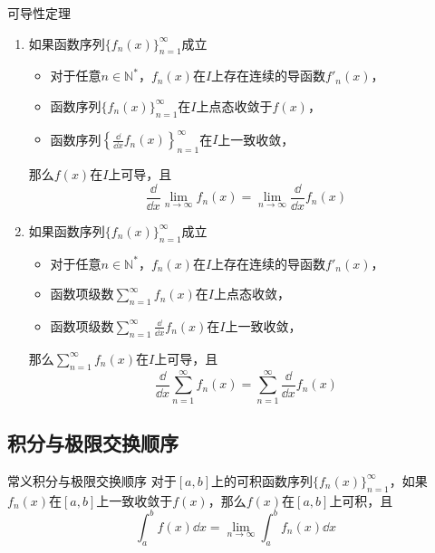 \documentclass[lang = cn, scheme = chinese, thmcnt = section]{elegantbook}
\newcommand{\N}{\mathbb{N}}            %
\newcommand{\dis}{\displaystyle}
\begin{document}
\begin{theorem}{可导性定理}
	\begin{enumerate}
		\item 如果函数序列$\{f_n(x)\}_{n=1}^{\infty}$成立
		\begin{itemize}
			\item 对于任意$n\in\N^*$，$f_n(x)$在$I$上存在连续的导函数$f'_n(x)$，
			\item 函数序列$\{f_n(x)\}_{n=1}^{\infty}$在$I$上点态收敛于$f(x)$，
			\item 函数序列$\left\{\frac{\dd}{\dd x}f_n(x)\right\}_{n=1}^{\infty}$在$I$上一致收敛，
		\end{itemize}
		那么$f(x)$在$I$上可导，且
		$$
		\frac{\dd}{\dd x}\lim_{n\to\infty}f_n(x)
		=\lim_{n\to\infty}\frac{\dd}{\dd x}f_n(x)
		$$
		\item 如果函数序列$\{f_n(x)\}_{n=1}^{\infty}$成立
		\begin{itemize}
			\item 对于任意$n\in\N^*$，$f_n(x)$在$I$上存在连续的导函数$f'_n(x)$，
			\item 函数项级数$\dis\sum_{n=1}^{\infty}f_n(x)$在$I$上点态收敛，
			\item 函数项级数$\dis\sum_{n=1}^{\infty}\frac{\dd}{\dd x}f_n(x)$在$I$上一致收敛，
		\end{itemize}
		那么$\dis\sum_{n=1}^{\infty}f_n(x)$在$I$上可导，且
		$$
		\frac{\dd}{\dd x}\sum_{n=1}^{\infty}f_n(x)
		=\sum_{n=1}^{\infty}\frac{\dd}{\dd x}f_n(x)
		$$
	\end{enumerate}
\end{theorem}

\subsection{积分与极限交换顺序}

\begin{theorem}{常义积分与极限交换顺序}
	对于$[a,b]$上的可积函数序列$\{f_n(x)\}_{n=1}^{\infty}$，如果$f_n(x)$在$[a,b]$上一致收敛于$f(x)$，那么$f(x)$在$[a,b]$上可积，且
	$$
	\int_{a}^{b}f(x)\dd x
	=
	\lim_{n\to\infty}\int_{a}^{b}f_n(x)\dd x
	$$
\end{theorem}
\end{document}
